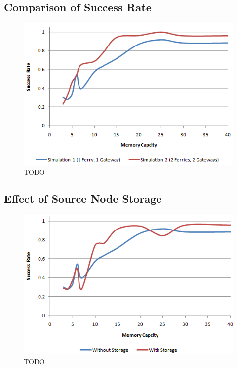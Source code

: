 \subsection{Comparison of Success Rate}

\begin{figure}[h!]
    \centering
    \includegraphics[width=.9\textwidth]{images/result_sccess_bothsim_128_dss}
    \caption{TODO}
\end{figure}

\subsection{Effect of Source Node Storage}

\begin{figure}[h!]
    \centering
    \includegraphics[width=.9\textwidth]{images/result_sccess_sim1byss_128}
    \caption{TODO}
\end{figure}


